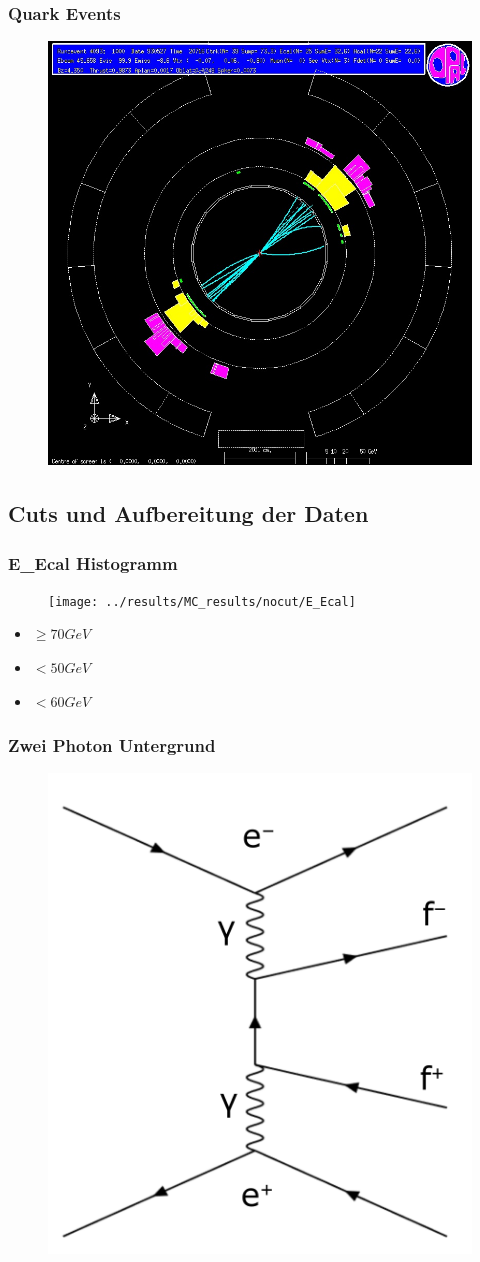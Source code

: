\begin{frame}
	\frametitle{Quark Events}
	\begin{figure}
		\centering
		\includegraphics[width=0.63\linewidth]{graphics/quarkopal}
	\end{figure}
\end{frame}
\subsection{Cuts und Aufbereitung der Daten}
\begin{frame}
	\frametitle{E\_Ecal Histogramm}
	\begin{figure}
		\centering
		\texttt{[image: ../results/MC\_results/nocut/E\_Ecal]}
	\end{figure}
	\begin{center}
		\begin{itemize}
			\item {} $\ge 70 \unit{GeV}$
			\item {} $< 50 \unit{GeV}$
			\item {} $< 60 \unit{GeV}$
		\end{itemize}
	\end{center}
\end{frame}

\begin{frame}
	\frametitle{Zwei Photon Untergrund}
	\begin{figure}
		\centering
		\includegraphics[width=0.55\linewidth]{graphics/twophotonfeynman}
	\end{figure}
\end{frame}


